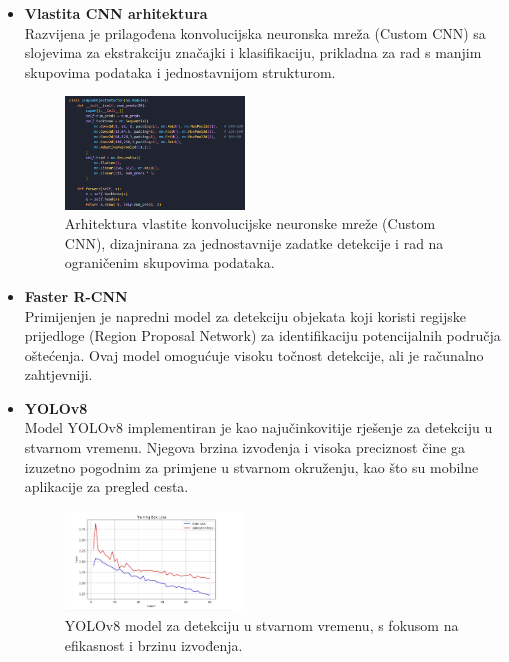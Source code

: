 \documentclass[conference]{IEEEtran}
\begin{document}
\begin{itemize}
    \item \textbf{Vlastita CNN arhitektura} \\
    Razvijena je prilagođena konvolucijska neuronska mreža (Custom CNN) sa slojevima za ekstrakciju značajki i klasifikaciju, prikladna za rad s manjim skupovima podataka i jednostavnijom strukturom.
    \begin{figure}[htbp]
    \centerline{\includegraphics[width=0.45\textwidth]{Images/CustomCNN.png}}
    \caption{Arhitektura vlastite konvolucijske neuronske mreže (Custom CNN), dizajnirana za jednostavnije zadatke detekcije i rad na ograničenim skupovima podataka.}
    \label{fig:customcnn}
    \end{figure}

    \item \textbf{Faster R-CNN} \\
    Primijenjen je napredni model za detekciju objekata koji koristi regijske prijedloge (Region Proposal Network) za identifikaciju potencijalnih područja oštećenja. Ovaj model omogućuje visoku točnost detekcije, ali je računalno zahtjevniji.

    \item \textbf{YOLOv8} \\
    Model YOLOv8 implementiran je kao najučinkovitije rješenje za detekciju u stvarnom vremenu. Njegova brzina izvođenja i visoka preciznost čine ga izuzetno pogodnim za primjene u stvarnom okruženju, kao što su mobilne aplikacije za pregled cesta.
    \begin{figure}[htbp]
    \centerline{\includegraphics[width=0.45\textwidth]{Images/YOLO.jpg}}
    \caption{YOLOv8 model za detekciju u stvarnom vremenu, s fokusom na efikasnost i brzinu izvođenja.}
    \label{fig:yolo}
    \end{figure}
\end{itemize}
\end{document}
